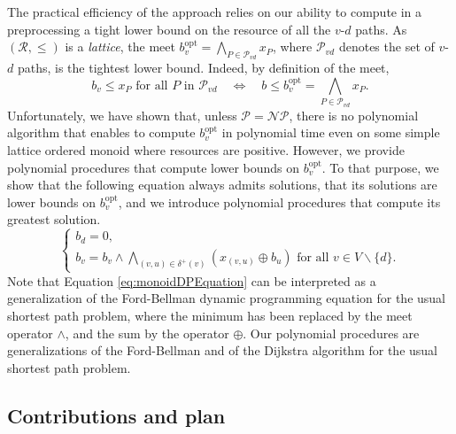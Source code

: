 \documentclass[11pt]{amsart}
\theoremstyle{plain}
\theoremstyle{remark}
\newcommand{\rplus}{\oplus}
\newcommand{\rleq}{\leqslant}
\newcommand{\rset}{\mathcal{R}}
\newcommand{\re}{x}
\newcommand{\meet}{\wedge} \newcommand{\bigmeet}{\bigwedge}
\begin{document}
The practical efficiency of the approach relies on our ability to compute in a preprocessing a tight lower bound on the resource of all the $v$-$d$ paths. As $(\rset,\rleq)$ is a \emph{lattice}, the meet $b_{v}^{\mathrm{opt}} = \bigmeet_{P\in \mathcal{P}_{vd}}\re_{P}$, where $\mathcal{P}_{vd}$ denotes the set of $v$-$d$ paths, is the tightest lower bound. Indeed, by definition of the meet,
\begin{equation*}
	b_{v} \rleq \re_{P} \text{ for all $P$ in }\mathcal{P}_{vd} \quad \Leftrightarrow \quad b \rleq b_{v}^{\mathrm{opt}} = \bigmeet_{P\in \mathcal{P}_{vd}}\re_{P}.
\end{equation*}
Unfortunately, we have shown \cite{parmentier2016thesis} that, unless $\mathcal{P} = \mathcal{NP}$, there is no polynomial algorithm that enables to compute $b_{v}^{\mathrm{opt}}$ in polynomial time even on some simple lattice ordered monoid where resources are positive. However, we provide polynomial procedures that compute lower bounds on $b_{v}^{\mathrm{opt}}$. To that purpose, we show that the following equation always admits solutions, that its solutions are lower bounds on $b_{v}^{\mathrm{opt}}$, and we introduce polynomial procedures that compute its greatest solution.
\begin{equation}\label{eq:monoidDPEquation}
	\left\{\begin{array}{l}
	b_{d} = 0, \\
	b_{v} = b_{v} \meet \displaystyle \bigmeet_{(v,u)\in \delta^{+}(v)}(x_{(v,u)} \rplus b_{u}) \text{ for all } v\in V\backslash \{d\}.
	\end{array}
	\right.
\end{equation}
Note that Equation \eqref{eq:monoidDPEquation} can be interpreted as a generalization of the Ford-Bellman dynamic programming equation for the usual shortest path problem, where the minimum has been replaced by the meet operator $\meet$, and the sum by the operator $\rplus$. Our polynomial procedures are generalizations of the Ford-Bellman and of the Dijkstra algorithm for the usual shortest path problem.

\subsection{Contributions and plan} \label{sub:contributions_and_plan}
\end{document}
